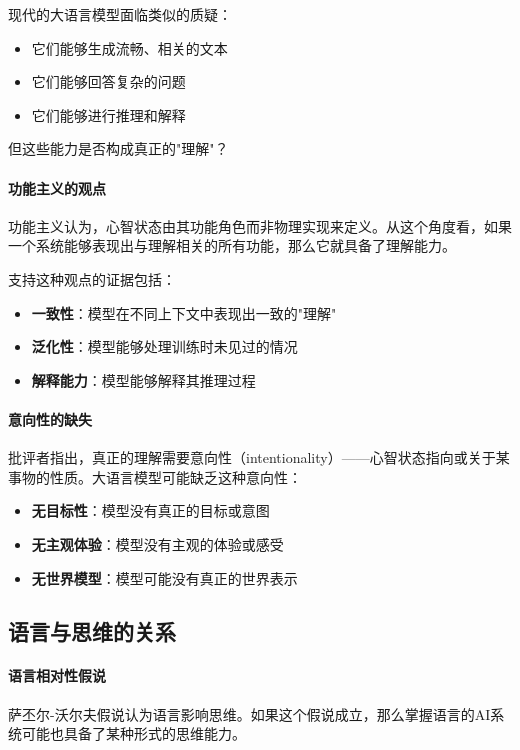 现代的大语言模型面临类似的质疑：
\begin{itemize}
\item 它们能够生成流畅、相关的文本
\item 它们能够回答复杂的问题
\item 它们能够进行推理和解释
\end{itemize}

但这些能力是否构成真正的"理解"？

\paragraph{功能主义的观点}
功能主义认为，心智状态由其功能角色而非物理实现来定义。从这个角度看，如果一个系统能够表现出与理解相关的所有功能，那么它就具备了理解能力。

支持这种观点的证据包括：
\begin{itemize}
\item \textbf{一致性}：模型在不同上下文中表现出一致的"理解"
\item \textbf{泛化性}：模型能够处理训练时未见过的情况
\item \textbf{解释能力}：模型能够解释其推理过程
\end{itemize}

\paragraph{意向性的缺失}
批评者指出，真正的理解需要意向性（intentionality）——心智状态指向或关于某事物的性质。大语言模型可能缺乏这种意向性：

\begin{itemize}
\item \textbf{无目标性}：模型没有真正的目标或意图
\item \textbf{无主观体验}：模型没有主观的体验或感受
\item \textbf{无世界模型}：模型可能没有真正的世界表示
\end{itemize}

\subsection{语言与思维的关系}

\paragraph{语言相对性假说}
萨丕尔-沃尔夫假说认为语言影响思维。如果这个假说成立，那么掌握语言的AI系统可能也具备了某种形式的思维能力。

